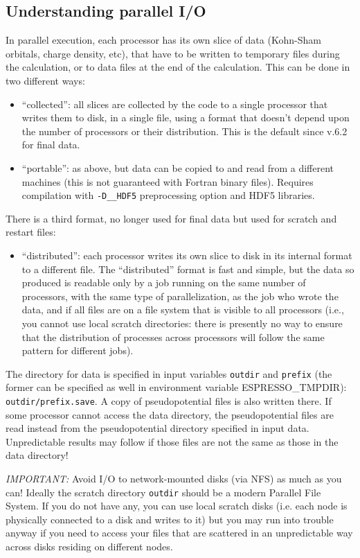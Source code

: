 \documentclass[12pt,a4paper]{article}
\begin{document}
\subsection{Understanding parallel I/O}
In parallel execution, each processor has its own slice of data
(Kohn-Sham orbitals, charge density, etc), that have to be written
to temporary files during the calculation,
or to data files at the end of the calculation.
This can be done in two different ways:
\begin{itemize}
\item ``collected'': all slices are
collected by the code to a single processor
that writes them to disk, in a single file,
using a format that doesn't depend upon
the number of processors or their distribution.
This is the default since v.6.2 for final data.
\item ``portable'': as above, but data can be
copied to and read from a different machines
(this is not guaranteed with Fortran binary files).
Requires compilation with \verb|-D__HDF5|
preprocessing option and HDF5 libraries.
\end{itemize}
There is a third format, no longer used for final
data but used for scratch and restart files:
\begin{itemize}
\item ``distributed'': each processor
writes its own slice to disk in its internal
format to a different file.
The ``distributed'' format is fast and simple,
but the data so produced is readable only by
a job running on the same number of processors,
with the same type of parallelization, as the
job who wrote the data, and if all
files are on a file system that is visible to all
processors (i.e., you cannot use local scratch
directories: there is presently no way to ensure
that the distribution of processes across
processors will follow the same pattern
for different jobs).
\end{itemize}

The directory for data is specified in input variables
\texttt{outdir} and \texttt{prefix} (the former can be specified
as well in environment variable ESPRESSO\_TMPDIR):
\texttt{outdir/prefix.save}. A copy of pseudopotential files
is also written there. If some processor cannot access the
data directory, the pseudopotential files are read instead
from the pseudopotential directory specified in input data.
Unpredictable results may follow if those files
are not the same as those in the data directory!

{\em IMPORTANT:}
Avoid I/O to network-mounted disks (via NFS) as much as you can!
Ideally the scratch directory \texttt{outdir} should be a modern
Parallel File System. If you do not have any, you can use local
scratch disks (i.e. each node is physically connected to a disk
and writes to it) but you may run into trouble anyway if you
need to access your files that are scattered in an unpredictable
way across disks residing on different nodes.
\end{document}
